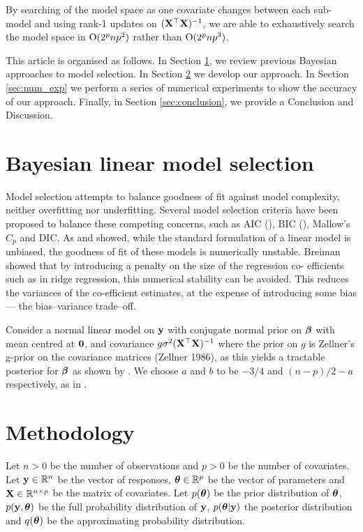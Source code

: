 \documentclass{amsart}[12pt]
\begin{document}
By searching of the model space as one covariate changes between each sub-model and  using rank-1 updates on
$({\bf X}^\top {\bf X})^{-1}$, we are able to exhaustively search the model space in $\text{O}(2^p np^2)$ rather than
$\text{O}(2^p np^3)$.

This article is organised as follows. In Section \ref{sec:model_selection}, we review previous Bayesian
approaches to model selection. In Section \ref{sec:methodology} we develop our approach. In Section
\ref{sec:num_exp} we perform a series of numerical experiments to show the accuracy of our approach. Finally,
in Section \ref{sec:conclusion}, we provide a Conclusion and Discussion.

\section{Bayesian linear model selection}
\label{sec:model_selection}

Model selection attempts to balance goodness of fit against model complexity, neither overfitting nor
underfitting. Several model selection criteria have been proposed to balance these competing concerns, such as
AIC (\cite{DeLeeuw1992}), BIC (\cite{Schwarz1978}), Mallow's $C_p$ and DIC. As \cite{Breiman1996} and
\cite{Efron2013} showed, while  the standard formulation of a linear model is unbiased, the goodness of fit of
these models is numerically  unstable. Breiman showed that by introducing a penalty on the size of the
regression co- efficients such as  in ridge regression, this numerical stability can be avoided. This reduces
the variances of the co-efficient estimates, at the expense of introducing some bias --- the bias--variance
trade--off.

Consider a normal linear model on ${\bf y}$ with conjugate normal prior on ${\boldsymbol \beta}$ with mean centred at ${\bf 0}$,
and covariance $g \sigma^2 ({\bf X}^\top {\bf X})^{-1}$ where the prior on $g$ is Zellner's g-prior on the covariance
matrices (Zellner 1986), as this yields a tractable posterior for ${\boldsymbol \beta}$ as shown by \cite{Liang2008}. We choose $a$  and $b$ to be $-3/4$ and $(n - p)/2 - a$ respectively, as in \cite{Maruyama2011}.

\section{Methodology}
\label{sec:methodology}

Let $n > 0$ be the number of observations and $p > 0$ be the number of covariates. Let ${\bf y} \in {\mathbb{R}}^n$ be the
vector of responses, ${\boldsymbol \theta} \in {\mathbb{R}}^p$ be the vector of parameters and ${\bf X} \in {\mathbb{R}}^{n \times p}$ be the
matrix of covariates. Let $p({\boldsymbol \theta})$ be the prior distribution of ${\boldsymbol \theta}$, $p({\bf y}, {\boldsymbol \theta})$ be the full
probability distribution of ${\bf y}$, $p({\boldsymbol \theta} | {\bf y})$ the posterior distribution and $q({\boldsymbol \theta})$ be the
approximating probability distribution.
\end{document}
